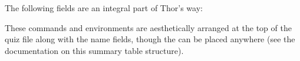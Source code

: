 \documentclass{article}
\begin{document}
\newtopic\noindent
The following fields are an integral part of Thor's way:
\bVerb{}%
\begin{dCmd}[commandchars=!()]{\bxSize}
\begin{sumryTblAux}{\currQuiz}
\end{sumryTblAux}
\end{dCmd}
\eVerb These commands and environments are aesthetically arranged at the top of the quiz file along with
the name fields, though the  can be placed anywhere (see the  documentation
on this summary table structure).
\end{document}
